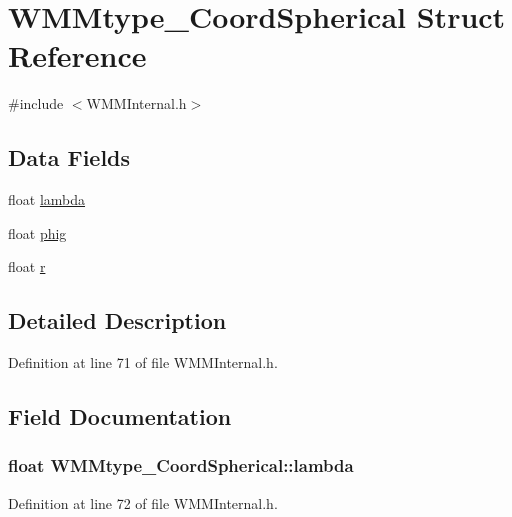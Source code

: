 \hypertarget{struct_w_m_mtype___coord_spherical}{\section{\-W\-M\-Mtype\-\_\-\-Coord\-Spherical \-Struct \-Reference}
\label{struct_w_m_mtype___coord_spherical}
}


{\ttfamily \#include $<$\-W\-M\-M\-Internal.\-h$>$}

\subsection*{\-Data \-Fields}
\begin{DoxyCompactItemize}
\item 
float \hyperlink{struct_w_m_mtype___coord_spherical_ac23771e3c14027441154228a3526bbfc}{lambda}
\item 
float \hyperlink{struct_w_m_mtype___coord_spherical_a94d857d131a4281543b46b4f3dc2a28e}{phig}
\item 
float \hyperlink{struct_w_m_mtype___coord_spherical_ad7a66b81a59d40782c0618c94256073f}{r}
\end{DoxyCompactItemize}


\subsection{\-Detailed \-Description}


\-Definition at line 71 of file \-W\-M\-M\-Internal.\-h.



\subsection{\-Field \-Documentation}
\hypertarget{struct_w_m_mtype___coord_spherical_ac23771e3c14027441154228a3526bbfc}{
\subsubsection[{lambda}]{\setlength{\rightskip}{0pt plus 5cm}float {\bf \-W\-M\-Mtype\-\_\-\-Coord\-Spherical\-::lambda}}}\label{struct_w_m_mtype___coord_spherical_ac23771e3c14027441154228a3526bbfc}


\-Definition at line 72 of file \-W\-M\-M\-Internal.\-h.

